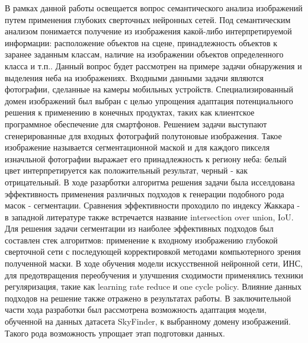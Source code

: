 





\Intro

В рамках данной работы освещается вопрос семантического анализа изображений путем применения глубоких сверточных нейронных сетей. Под семантическим анализом понимается получение из изображения какой-либо интерпретируемой информации: расположение объектов на сцене, принадлежность объектов к заранее заданным классам, наличие на изображении объектов определенного класса и т.п.. Данный вопрос будет рассмотрен на примере задачи обнаружения и выделения неба на изображениях. Входными данными задачи являются фотографии, сделанные на камеры мобильных устройств. Специализированный домен изображений был выбран с целью упрощения адаптация потенциального решения к применению в конечных продуктах, таких как клиентское программное обеспечение для смартфонов. Решением задачи выступают сгенерированные для входных фотографий полутоновые изображения. Такое изображение называется сегментационной маской и для каждого пикселя изначльной фотографии выражает его принадлежность к региону неба: белый цвет интерпретируется как положительный результат, черный - как отрицательный. В ходе разарботки алгоритма решения задачи была исселдована эффективность применения различных подходов к генерации подобного рода масок - сегментации. Сравнения эффективности проходило по индексу Жаккара - в западной литературе также встречается название intersection over union, IoU. Для решения задачи сегментации из наиболее эффективных подходов был составлен стек алгоритмов: применение к входному изображению глубокой сверточной сети с последующей корректировкой методами компьютерного зрения полученной маски. В ходе обучения модели искусственной нейронной сети, ИНС, для предотвращения переобучения и улучшения сходимости применялись техники регуляризация, такие как learning rate reduce и one cycle policy. Влияние данных подходов на решение также отражено в результатах работы. В заключительной части хода разработки был рассмотрена возможность адаптация модели, обученной на данных датасета SkyFinder, к выбранному домену изображений. Такого рода возможность упрощает этап подготовки данных.

